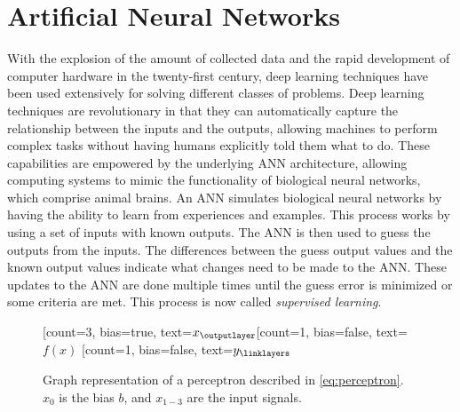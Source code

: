 \section{Artificial Neural Networks}

With the explosion of the amount of collected data and the rapid development of computer hardware in the twenty-first century, deep learning techniques have been used extensively for solving different classes of problems.
Deep learning techniques are revolutionary in that they can automatically capture the relationship between the inputs and the outputs, allowing machines to perform complex tasks without having humans explicitly told them what to do.
These capabilities are empowered by the underlying \gls{ANN} architecture, allowing computing systems to mimic the functionality of biological neural networks, which comprise animal brains.
An \gls{ANN} simulates biological neural networks by having the ability to learn from experiences and examples.
This process works by using a set of inputs with known outputs.
The \gls{ANN} is then used to guess the outputs from the inputs.
The differences between the guess output values and the known output values indicate what changes need to be made to the \gls{ANN}.
These updates to the \gls{ANN} are done multiple times until the guess error is minimized or some criteria are met.
This process is now called \textit{supervised learning}.

\begin{figure}[h]
    \centering
    \begin{neuralnetwork}
        \newcommand{\nodex}[2]{$x_#2$}
        \newcommand{\nodefx}[2]{$f(x)$}
        \newcommand{\nodey}[2]{$y_#2$}

        \newcommand{\nodewfirstlayer}[1]{\ifnum0=#1 {} \else $w_#1$ \fi}
        \newcommand{\nodew}[4]{\ifnum0=#1 \nodewfirstlayer{#2} \else {} \fi}
        \setdefaultlinklabel{\nodew}

        [count=3, bias=true, text=\nodex]
        \outputlayer[count=1, bias=false, text=\nodefx]
        \linklayers
        \outputlayer[count=1, bias=false, text=\nodey]
        \linklayers
    \end{neuralnetwork}
    \caption{Graph representation of a perceptron described in \autoref{eq:perceptron}. $x_0$ is the bias $b$, and $x_{1-3}$ are the input signals.}
    \label{fig:perceptron}
\end{figure}

